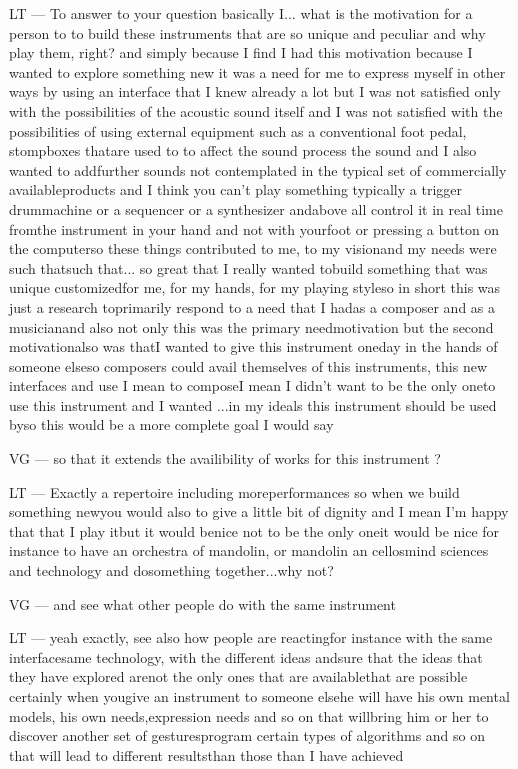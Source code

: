 LT — To answer to your question basically I... what is the motivation for a person to to build these instruments that are so unique and peculiar and why play them, right? and simply because I find I had this motivation because I wanted to explore something new it was a need for me to express myself in other ways by using an interface that I knew already a lot but I was not satisfied only with the possibilities of the acoustic sound itself and I was not satisfied with the possibilities of using external equipment such as a conventional foot pedal, stompboxes thatare used to to affect the sound process the sound and I also wanted to addfurther sounds not contemplated in the typical set of commercially availableproducts and I think you can't play something typically a trigger drummachine or a sequencer or a synthesizer andabove all control it in real time fromthe instrument in your hand and not with yourfoot or pressing a button on the computerso these things contributed to me, to my visionand my needs were such thatsuch that... so great that I really wanted tobuild something that was unique customizedfor me, for my hands, for my playing styleso in short this was just a research toprimarily respond to a need that I hadas a composer and as a musicianand also not only this was the primary needmotivation but the second motivationalso was thatI wanted to give this instrument oneday in the hands of someone elseso composers could avail themselves of this instruments, this new interfaces and use I mean to composeI mean I didn't want to be the only oneto use this instrument and I wanted ...in my ideals this instrument should be used byso this would be a more complete goal I would say

VG — so that it extends the availibility of works for this instrument ?

LT — Exactly a repertoire including moreperformances so when we build something newyou would also to give a little bit of dignity and I mean I'm happy that that I play itbut it would benice not to be the only oneit would be nice for instance to have an orchestra of mandolin, or mandolin an cellosmind sciences and technology and dosomething together...why not?

VG — and see what other people do with the same instrument

LT — yeah exactly, see also how people are reactingfor instance with the same interfacesame technology, with the different ideas andsure that the ideas that they have explored arenot the only ones that are availablethat are possible certainly when yougive an instrument to someone elsehe will have his own mental models, his own needs,expression needs and so on that willbring him or her to discover another set of gesturesprogram certain types of algorithms and so on that will lead to different resultsthan those than I have achieved

